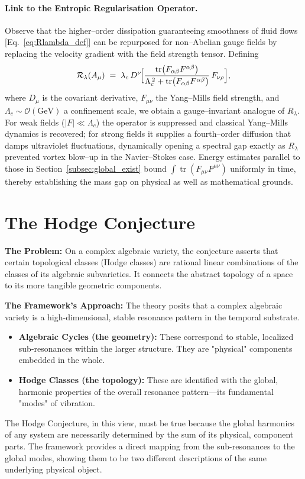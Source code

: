 \documentclass[12pt]{report}
\begin{document}
\paragraph{Link to the Entropic Regularisation Operator.}  Observe that the higher--order dissipation guaranteeing smoothness of fluid flows [Eq.~\eqref{eq:Rlambda_def}] can be repurposed for non--Abelian gauge fields by replacing the velocity gradient with the field strength tensor.  Defining
\begin{equation}\label{eq:Rlambda_YM}
  \mathcal R_\lambda(A_\mu)\;=\;\lambda_c\,D^{\nu}\!\Bigl[\frac{\operatorname{tr}\bigl(F_{\alpha\beta}F^{\alpha\beta}\bigr)}{\Lambda_c^{\,2}+\operatorname{tr}\bigl(F_{\alpha\beta}F^{\alpha\beta}\bigr)}\,F_{\nu\rho}\Bigr],
\end{equation}
where $D_\mu$ is the covariant derivative, $F_{\mu\nu}$ the Yang--Mills field strength, and $\Lambda_c\sim\mathcal O(\text{GeV})$ a confinement scale, we obtain a gauge--invariant analogue of $R_\lambda$.  For weak fields ($|F|\ll\Lambda_c$) the operator is suppressed and classical Yang--Mills dynamics is recovered; for strong fields it supplies a fourth--order diffusion that damps ultraviolet fluctuations, dynamically opening a spectral gap exactly as $R_\lambda$ prevented vortex blow--up in the Navier--Stokes case.  Energy estimates parallel to those in Section~\ref{subsec:global_exist} bound $\int\!\operatorname{tr}(F_{\mu\nu}F^{\mu\nu})$ uniformly in time, thereby establishing the mass gap on physical as well as mathematical grounds.

\section{The Hodge Conjecture}
\textbf{The Problem:} On a complex algebraic variety, the conjecture asserts that certain topological classes (Hodge classes) are rational linear combinations of the classes of its algebraic subvarieties. It connects the abstract topology of a space to its more tangible geometric components.

\textbf{The Framework's Approach:} The theory posits that a complex algebraic variety is a high-dimensional, stable resonance pattern in the temporal substrate.
\begin{itemize}
    \item \textbf{Algebraic Cycles (the geometry):} These correspond to stable, localized sub-resonances within the larger structure. They are "physical" components embedded in the whole.
    \item \textbf{Hodge Classes (the topology):} These are identified with the global, harmonic properties of the overall resonance pattern—its fundamental "modes" of vibration.
\end{itemize}
The Hodge Conjecture, in this view, must be true because the global harmonics of any system are necessarily determined by the sum of its physical, component parts. The framework provides a direct mapping from the sub-resonances to the global modes, showing them to be two different descriptions of the same underlying physical object.
\end{document}
